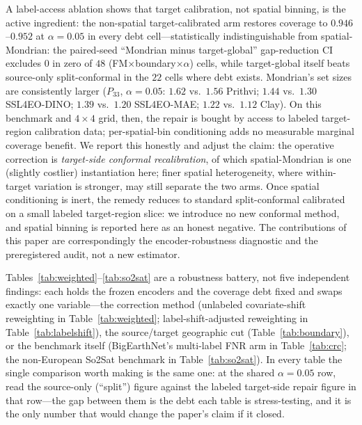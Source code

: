 \documentclass[11pt]{article}
\begin{document}
A label-access ablation shows that target calibration, not spatial binning, is the active ingredient: the
non-spatial target-calibrated arm restores coverage to $0.946$--$0.952$ at $\alpha=0.05$ in every debt
cell---statistically indistinguishable from spatial-Mondrian: the paired-seed ``Mondrian minus
target-global'' gap-reduction CI excludes $0$ in zero of $48$ (FM$\times$boundary$\times\alpha$)
cells, while target-global itself beats source-only split-conformal in the $22$ cells where debt exists.
Mondrian's set sizes are consistently larger ($P_{33}$, $\alpha=0.05$: $1.62$ vs.\ $1.56$ Prithvi;
$1.44$ vs.\ $1.30$ SSL4EO-DINO; $1.39$ vs.\ $1.20$ SSL4EO-MAE; $1.22$ vs.\ $1.12$ Clay). On this benchmark
and $4\times4$ grid, then, the repair is bought by access to labeled target-region calibration data;
per-spatial-bin conditioning adds no measurable marginal coverage benefit. We report this honestly and
adjust the claim: the operative correction is \emph{target-side conformal recalibration}, of which
spatial-Mondrian is one (slightly costlier) instantiation here; finer spatial heterogeneity, where
within-target variation is stronger, may still separate the two arms. Once spatial conditioning is inert,
the remedy reduces to standard split-conformal calibrated on a small labeled target-region slice: we
introduce no new conformal method, and spatial binning is reported here as an honest negative. The
contributions of this paper are correspondingly the encoder-robustness diagnostic and the
preregistered audit, not a new estimator.

Tables~\ref{tab:weighted}--\ref{tab:so2sat} are a robustness battery, not five independent findings: each
holds the frozen encoders and the coverage debt fixed and swaps exactly one variable---the correction
method (unlabeled covariate-shift reweighting in Table~\ref{tab:weighted}; label-shift-adjusted
reweighting in Table~\ref{tab:labelshift}), the source/target geographic cut (Table~\ref{tab:boundary}),
or the benchmark itself (BigEarthNet's multi-label FNR arm in Table~\ref{tab:crc}; the non-European
So2Sat benchmark in Table~\ref{tab:so2sat}). In every table the single comparison worth making is the
same one: at the shared $\alpha=0.05$ row, read the source-only (``split'') figure against the labeled
target-side repair figure in that row---the gap between them is the debt each table is stress-testing,
and it is the only number that would change the paper's claim if it closed.
\end{document}
